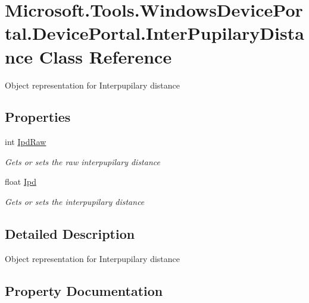 \hypertarget{class_microsoft_1_1_tools_1_1_windows_device_portal_1_1_device_portal_1_1_inter_pupilary_distance}{}\section{Microsoft.\+Tools.\+Windows\+Device\+Portal.\+Device\+Portal.\+Inter\+Pupilary\+Distance Class Reference}
\label{class_microsoft_1_1_tools_1_1_windows_device_portal_1_1_device_portal_1_1_inter_pupilary_distance}


Object representation for Interpupilary distance  


\subsection*{Properties}
\begin{DoxyCompactItemize}
\item 
int \hyperlink{class_microsoft_1_1_tools_1_1_windows_device_portal_1_1_device_portal_1_1_inter_pupilary_distance_a33421a9c03ce6a59da39b690d43387e2}{Ipd\+Raw}
\begin{DoxyCompactList}\small\item\em Gets or sets the raw interpupilary distance \end{DoxyCompactList}\item 
float \hyperlink{class_microsoft_1_1_tools_1_1_windows_device_portal_1_1_device_portal_1_1_inter_pupilary_distance_a5c4888665e1fca9932ebb34f92939711}{Ipd}
\begin{DoxyCompactList}\small\item\em Gets or sets the interpupilary distance \end{DoxyCompactList}\end{DoxyCompactItemize}


\subsection{Detailed Description}
Object representation for Interpupilary distance 



\subsection{Property Documentation}
